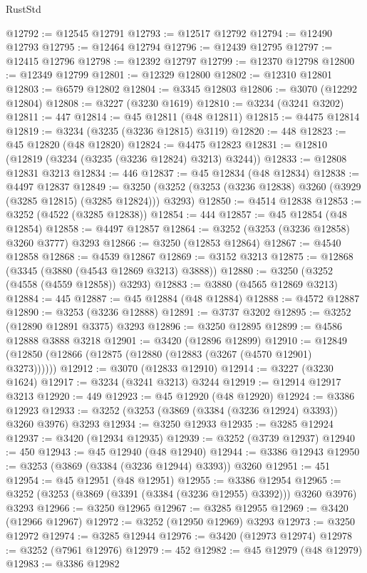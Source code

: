 \begin{lexlean}{RustStd}
\begin{coremodule}
@12792 := @12545 @12791
@12793 := @12517 @12792
@12794 := @12490 @12793
@12795 := @12464 @12794
@12796 := @12439 @12795
@12797 := @12415 @12796
@12798 := @12392 @12797
@12799 := @12370 @12798
@12800 := @12349 @12799
@12801 := @12329 @12800
@12802 := @12310 @12801
@12803 := @6579 @12802
@12804 := @3345 @12803
@12806 := @3070 (@12292 @12804)
@12808 := @3227 (@3230 @1619)
@12810 := @3234 (@3241 @3202)
@12811 := 447
@12814 := @45 @12811 (@48 @12811)
@12815 := @4475 @12814
@12819 := @3234 (@3235 (@3236 @12815) @3119)
@12820 := 448
@12823 := @45 @12820 (@48 @12820)
@12824 := @4475 @12823
@12831 := @12810 (@12819 (@3234 (@3235 (@3236 @12824) @3213) @3244))
@12833 := @12808 @12831 @3213
@12834 := 446
@12837 := @45 @12834 (@48 @12834)
@12838 := @4497 @12837
@12849 := @3250 (@3252 (@3253 (@3236 @12838) @3260 (@3929 (@3285 @12815) (@3285 @12824))) @3293)
@12850 := @4514 @12838
@12853 := @3252 (@4522 (@3285 @12838))
@12854 := 444
@12857 := @45 @12854 (@48 @12854)
@12858 := @4497 @12857
@12864 := @3252 (@3253 (@3236 @12858) @3260 @3777) @3293
@12866 := @3250 (@12853 @12864)
@12867 := @4540 @12858
@12868 := @4539 @12867
@12869 := @3152 @3213
@12875 := @12868 (@3345 (@3880 (@4543 @12869 @3213) @3888))
@12880 := @3250 (@3252 (@4558 (@4559 @12858)) @3293)
@12883 := @3880 (@4565 @12869 @3213)
@12884 := 445
@12887 := @45 @12884 (@48 @12884)
@12888 := @4572 @12887
@12890 := @3253 (@3236 @12888)
@12891 := @3737 @3202
@12895 := @3252 (@12890 @12891 @3375) @3293
@12896 := @3250 @12895
@12899 := @4586 @12888 @3888 @3218
@12901 := @3420 (@12896 @12899)
@12910 := @12849 (@12850 (@12866 (@12875 (@12880 (@12883 (@3267 (@4570 @12901) @3273))))))
@12912 := @3070 (@12833 @12910)
@12914 := @3227 (@3230 @1624)
@12917 := @3234 (@3241 @3213) @3244
@12919 := @12914 @12917 @3213
@12920 := 449
@12923 := @45 @12920 (@48 @12920)
@12924 := @3386 @12923
@12933 := @3252 (@3253 (@3869 (@3384 (@3236 @12924) @3393)) @3260 @3976) @3293
@12934 := @3250 @12933
@12935 := @3285 @12924
@12937 := @3420 (@12934 @12935)
@12939 := @3252 (@3739 @12937)
@12940 := 450
@12943 := @45 @12940 (@48 @12940)
@12944 := @3386 @12943
@12950 := @3253 (@3869 (@3384 (@3236 @12944) @3393)) @3260
@12951 := 451
@12954 := @45 @12951 (@48 @12951)
@12955 := @3386 @12954
@12965 := @3252 (@3253 (@3869 (@3391 (@3384 (@3236 @12955) @3392))) @3260 @3976) @3293
@12966 := @3250 @12965
@12967 := @3285 @12955
@12969 := @3420 (@12966 @12967)
@12972 := @3252 (@12950 @12969) @3293
@12973 := @3250 @12972
@12974 := @3285 @12944
@12976 := @3420 (@12973 @12974)
@12978 := @3252 (@7961 @12976)
@12979 := 452
@12982 := @45 @12979 (@48 @12979)
@12983 := @3386 @12982

\end{coremodule}
\end{lexlean}
